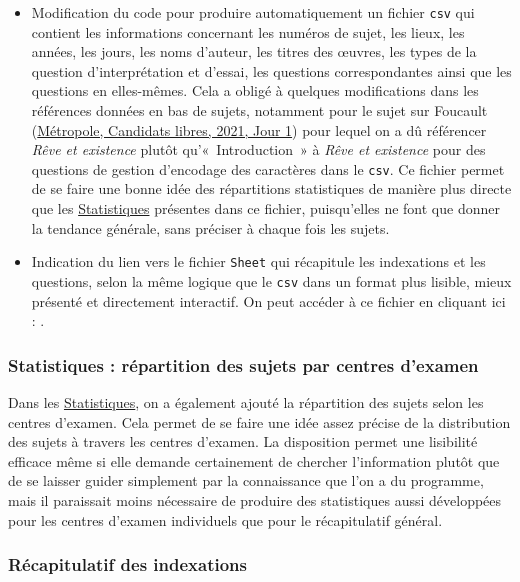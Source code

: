 \begin{itemize}
\item Modification du code pour produire automatiquement un fichier \texttt{csv} qui contient les informations concernant les numéros de sujet, les lieux, les années, les jours, les noms d'auteur, les titres des œuvres, les types de la question d'interprétation et d'essai, les questions correspondantes ainsi que les questions en elles-mêmes. Cela a obligé à quelques modifications dans les références données en bas de sujets, notamment pour le sujet sur Foucault (\hyperlink{metcal_2021_1_1}{Métropole, Candidats libres, 2021, Jour 1}) pour lequel on a dû référencer \textit{Rêve et existence} plutôt qu'«~Introduction~» à \textit{Rêve et existence} pour des questions de gestion d'encodage des caractères dans le \texttt{csv}. Ce fichier permet de se faire une bonne idée des répartitions statistiques de manière plus directe que les \hyperlink{statistiques}{Statistiques} présentes dans ce fichier, puisqu'elles ne font que donner la tendance générale, sans préciser à chaque fois les sujets.

\item Indication du lien vers le fichier \texttt{Sheet} qui récapitule les indexations et les questions, selon la même logique que le \texttt{csv} dans un format plus lisible, mieux présenté et directement interactif. On peut accéder à ce fichier en cliquant ici : \sujetscsv{}.
\end{itemize}

\subsubsection{Statistiques : répartition des sujets par centres d'examen}

Dans les \hyperlink{statistiques}{Statistiques}, on a également ajouté la répartition des sujets selon les centres d'examen. Cela permet de se faire une idée assez précise de la distribution des sujets à travers les centres d'examen. La disposition permet une lisibilité efficace même si elle demande certainement de chercher l'information plutôt que de se laisser guider simplement par la connaissance que l'on a du programme, mais il paraissait moins nécessaire de produire des statistiques aussi développées pour les centres d'examen individuels que pour le récapitulatif général. 

\subsubsection{Récapitulatif des indexations}

